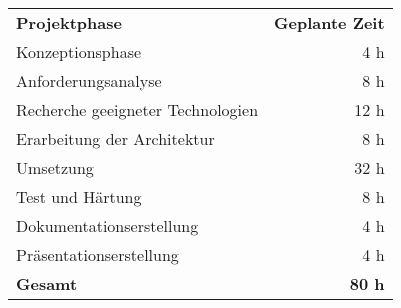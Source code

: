\begin{tabular}{lr}
\rowcolor{heading}\textbf{Projektphase} & \textbf{Geplante Zeit} \\
Konzeptionsphase & 4 h \\
\rowcolor{odd}Anforderungsanalyse & 8 h \\
Recherche geeigneter Technologien & 12 h \\
\rowcolor{odd}Erarbeitung der Architektur & 8 h \\
Umsetzung & 32 h \\
\rowcolor{odd}Test und Härtung & 8 h \\
Dokumentationserstellung & 4 h \\
\rowcolor{odd}Präsentationserstellung & 4 h \\
\hline
\hline
\rowcolor{odd}\textbf{Gesamt} & \textbf{80 h} \\
\end{tabular}
